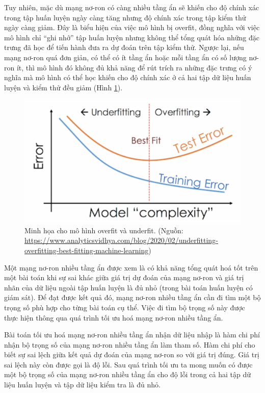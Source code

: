 Tuy nhiên, mặc dù mạng nơ-ron có càng nhiều tầng ẩn sẽ khiến cho độ chính xác trong tập huấn luyện ngày càng tăng nhưng độ chính xác trong tập kiểm thử ngày càng giảm. Đây là biểu hiện của việc mô hình bị overfit, đồng nghĩa với việc mô hình chỉ ``ghi nhớ'' tập huấn luyện nhưng không thể tổng quát hóa những đặc trưng đã học để tiến hành đưa ra dự đoán trên tập kiểm thử. Ngược lại, nếu mạng nơ-ron quá đơn giản, có thể có ít tầng ẩn hoặc mỗi tầng ẩn có số lượng nơ-ron ít, thì mô hình đó không đủ khả năng để rút trích ra những đặc trưng có ý nghĩa mà mô hình có thể học khiến cho độ chính xác ở cả hai tập dữ liệu huấn luyện và kiểm thử đều giảm (Hình \ref{fig:under-over}).

\begin{figure}[htp]
\centering
\includegraphics[width=100 mm]{images/under-over.png}
\caption{Minh họa cho mô hình overfit và underfit. (Nguồn: \url{https://www.analyticsvidhya.com/blog/2020/02/underfitting-overfitting-best-fitting-machine-learning})}
\label{fig:under-over}
\end{figure}

Một mạng nơ-ron nhiều tầng ẩn được xem là có khả năng tổng quát hoá tốt trên một bài toán khi sự sai khác giữa giá trị dự đoán của mạng nơ-ron và giá trị nhãn của dữ liệu ngoài tập huấn luyện là đủ nhỏ (trong bài toán huấn luyện có giám sát). Để đạt được kết quả đó, mạng nơ-ron nhiều tầng ẩn cần đi tìm một bộ trọng số phù hợp cho từng bài toán cụ thể. Việc đi tìm bộ trọng số này được thực hiện thông qua quá trình tối ưu hoá mạng nơ-ron nhiều tầng ẩn.

Bài toán tối ưu hoá mạng nơ-ron nhiều tầng ẩn nhận dữ liệu nhập là hàm chi phí nhận bộ trọng số của mạng nơ-ron nhiều tầng ẩn làm tham số. Hàm chi phí cho biết sự sai lệch giữa kết quả dự đoán của mạng nơ-ron so với giá trị đúng. Giá trị sai lệch này còn được gọi là độ lỗi. Sau quá trình tối ưu ta mong muốn có được một bộ trọng số của mạng nơ-ron nhiều tầng ẩn cho độ lỗi trong cả hai tập dữ liệu huấn luyện và tập dữ liệu kiểm tra là đủ nhỏ.

